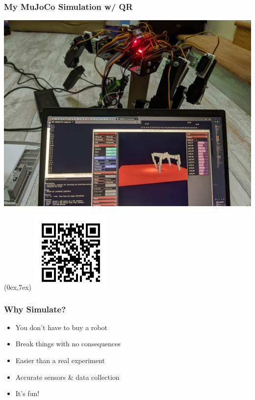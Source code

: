 \documentclass[14pt]{beamer}
\begin{document}
	\begin{frame}
		\frametitle{My MuJoCo Simulation \small{w/ QR}}
		
		\includegraphics[width=\linewidth,trim={0 0 10cm 0},clip]{quadruped_v1_control.jpg}
		
		\begin{textblock*}{\textwidth}(0ex,7ex)
			\includegraphics[width=4cm]{wcf_qr_cyberchef_mod8_m4_quartile.png} %
		\end{textblock*}
		
		
	\end{frame}
	
	\begin{frame}
		\frametitle{Why Simulate?}
		
		\begin{itemize}
			\item You don't have to buy a robot
			\item Break things with no consequences
			\item Easier than a real experiment
			\item Accurate sensors \& data collection
			\item It's fun!
		\end{itemize}
	\end{frame}
	
\end{document}
